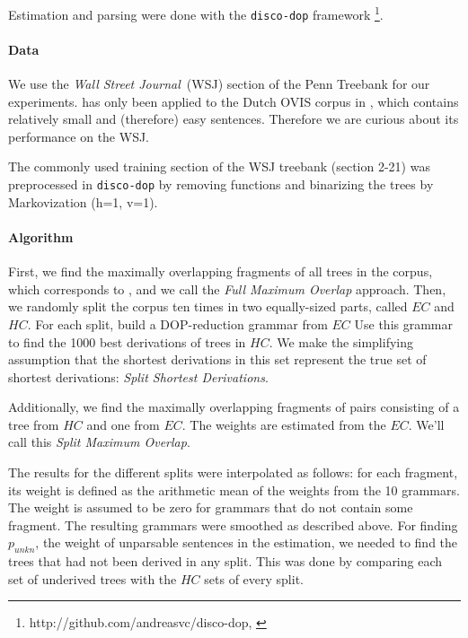 Estimation and parsing were done with the {\tt disco-dop} framework
 \footnote{http://github.com/andreasvc/disco-dop, \cite{cranenburgh2011}}.


\paragraph{Data}
We use the \emph{Wall Street Journal}~(WSJ) section of the Penn Treebank for our experiments. \dops{} has only been applied to the Dutch OVIS corpus in \cite{zollmann2005}, which contains relatively small and (therefore) easy sentences. Therefore we are curious about its performance on the WSJ.

The commonly used training section of the WSJ treebank (section 2-21) was preprocessed in {\tt disco-dop} by removing functions and binarizing the trees by Markovization (h=1, v=1). %



\paragraph{Algorithm}
First, we find the maximally overlapping fragments of all trees in the corpus, which corresponds to \ddop, and we call the \emph{Full Maximum Overlap} approach.
Then, we randomly split the corpus ten times in two equally-sized parts, called $EC$ and $HC$. For each split, build a DOP-reduction grammar from $EC$ 
Use this grammar to find the 1000 best derivations of trees in $HC$. We make the simplifying assumption that the shortest derivations in this set  represent the true set of shortest derivations: \emph{Split Shortest Derivations}.

 Additionally, we find the maximally overlapping fragments of pairs consisting of a tree from $HC$ and one from $EC$. The weights are estimated from the $EC$. We'll call this \emph{Split Maximum Overlap}.

The results for the different splits were interpolated as follows: for each fragment, its weight is defined as the arithmetic mean of the weights from the 10 grammars. The weight is assumed to be zero for grammars that do not contain some fragment.
The resulting grammars were smoothed as described above. For finding $p_{unkn}$, the weight of unparsable sentences in the \dops{} estimation, we needed to find the trees that had not been derived in any split. This was done by comparing each set of underived trees with the $HC$ sets of every split.

